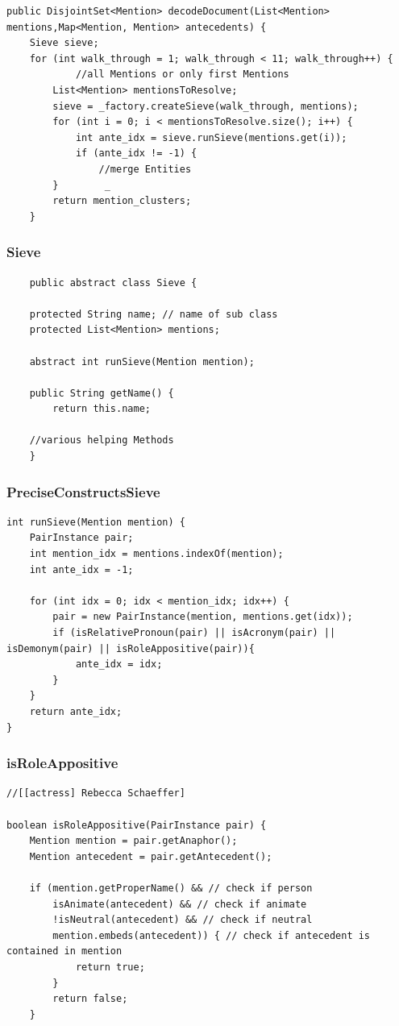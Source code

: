 \documentclass[11pt,a4paper]{beamer}
\begin{document}
\begin{frame}[fragile]
\begin{lstlisting}
public DisjointSet<Mention> decodeDocument(List<Mention> mentions,Map<Mention, Mention> antecedents) {   		
    Sieve sieve;        
    for (int walk_through = 1; walk_through < 11; walk_through++) {       	
        	//all Mentions or only first Mentions  
        List<Mention> mentionsToResolve;  
        sieve = _factory.createSieve(walk_through, mentions);
        for (int i = 0; i < mentionsToResolve.size(); i++) {		    	
            int ante_idx = sieve.runSieve(mentions.get(i));
            if (ante_idx != -1) {
                //merge Entities
        }        _
	    return mention_clusters;
	}
\end{lstlisting}

\end{frame}

\begin{frame}[fragile]
\frametitle{Sieve}
\begin{lstlisting}
	public abstract class Sieve {

	protected String name; // name of sub class	
	protected List<Mention> mentions;
	 
	abstract int runSieve(Mention mention);
	
	public String getName() {
	    return this.name;
		
	//various helping Methods
	}
\end{lstlisting}
\end{frame}

\begin{frame}[fragile]
\frametitle{PreciseConstructsSieve}
\begin{lstlisting}
int runSieve(Mention mention) {
    PairInstance pair;
    int mention_idx = mentions.indexOf(mention);
    int ante_idx = -1;
		
    for (int idx = 0; idx < mention_idx; idx++) {			
        pair = new PairInstance(mention, mentions.get(idx));
        if (isRelativePronoun(pair) || isAcronym(pair) || isDemonym(pair) || isRoleAppositive(pair)){            
            ante_idx = idx;
        }
    }
    return ante_idx;
}
\end{lstlisting}
\end{frame}

\begin{frame}[fragile]
\frametitle{isRoleAppositive}
\begin{lstlisting}
//[[actress] Rebecca Schaeffer]

boolean isRoleAppositive(PairInstance pair) {
    Mention mention = pair.getAnaphor();
    Mention antecedent = pair.getAntecedent();
    
    if (mention.getProperName() && // check if person
        isAnimate(antecedent) && // check if animate
        !isNeutral(antecedent) && // check if neutral
        mention.embeds(antecedent)) { // check if antecedent is contained in mention							
            return true;
		}
		return false;
	}
\end{lstlisting}
\end{frame}
\end{document}
